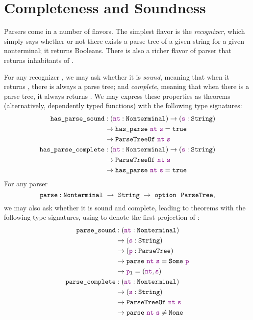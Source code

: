 \chapter{Completeness and Soundness}\label{ch:correctness}
    Parsers come in a number of flavors.  The simplest flavor is the \emph{recognizer}, which simply says whether or not there exists a parse tree of a given string for a given nonterminal; it returns Booleans.  There is also a richer flavor of parser that returns inhabitants of .

    For any recognizer , we may ask whether it is \emph{sound}, meaning that when it returns \true, there is always a parse tree; and \emph{complete}, meaning that when there is a parse tree, it always returns \true.  We may express these properties as theorems (alternatively, dependently typed functions) with the following type signatures:
    \begin{align*}
      \fname{has\_parse\_sound} & \oftypesep
      (\oftype{\farg{nt}}{\Nonterminal})
      \typeto (\oftype{\farg{s}}{\String}) \\
      & \typeto \fname{has\_parse}~\farg{nt}~\farg{s} = \true \\
      & \typeto \indname{ParseTreeOf}~\farg{nt}~\farg{s} \\
      \fname{has\_parse\_complete} & \oftypesep
      (\oftype{\farg{nt}}{\Nonterminal})
      \typeto (\oftype{\farg{s}}{\String}) \\
      & \typeto \indname{ParseTreeOf}~\farg{nt}~\farg{s} \\
      & \typeto \fname{has\_parse}~\farg{nt}~\farg{s} = \true
    \end{align*}
    For any parser
    $$\oftype{\fname{parse}}{\Nonterminal~\typeto~\String~\typeto~\typeoption{\indname{ParseTree}}},$$
    we may also ask whether it is sound and complete, leading to theorems with the following type signatures, using  to denote the first projection of :
    \begin{align*}
      \fname{parse\_sound} & \oftypesep
      (\oftype{\farg{nt}}{\Nonterminal}) \\
      & \typeto (\oftype{\farg{s}}{\String}) \\
      & \typeto (\oftype{\farg{p}}{\indname{ParseTree}}) \\
      & \typeto \fname{parse}~\farg{nt}~\farg{s} = \Some{\farg{p}} \\
      & \typeto \proj1{\farg{p}} = (\farg{nt}, \farg{s}) \\
      \fname{parse\_complete} & \oftypesep
      (\oftype{\farg{nt}}{\Nonterminal}) \\
      & \typeto (\oftype{\farg{s}}{\String}) \\
      & \typeto \indname{ParseTreeOf}~\farg{nt}~\farg{s} \\
      & \typeto \fname{parse}~\farg{nt}~\farg{s} \neq \None
    \end{align*}
